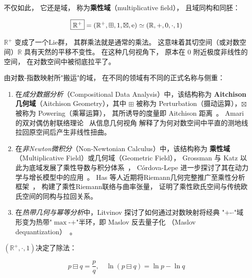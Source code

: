 ﻿\documentclass[10pt,a4paper]{article}
\numberwithin{equation}{section}
\newcommand{\sqplus}{\mathbin{\boxplus}}
\newcommand{\sqtimes}{\mathbin{\boxtimes}}
\newcommand{\sqminus}{\mathbin{\boxminus}}
\begin{document}
不仅如此，
它还是域，
称为\textbf{乘性域}（multiplicative field），
且域同构和同胚：

\begin{equation}
\boxed{\mathbb R^+} = (\mathbb R^+,\sqplus,1,\sqtimes,\text e)
\simeq
(\mathbb R,+,0,\cdot,1)
\label{eq:Multiplicative-Field}
\end{equation}

$\mathbb R^+$ 变成了一个Lie群，
其群乘法就是通常的乘法。
这意味着其切空间（或对数空间）$\mathbb R$ 具有天然的平移不变性。
在这种几何视角下，
原本在 $0$ 附近极度非线性的空间，
在对数空间中被彻底拉平了。

\begin{framed}

由对数-指数映射所"搬运"的域，
在不同的领域有不同的正式名称与侧重：
\begin{enumerate}
  \item 在\emph{成分数据分析}（Compositional Data Analysis）中，该结构称为
  \textbf{Aitchison 几何域}（Aitchison Geometry），其中 $\sqplus$
  被称为 Perturbation（摄动运算），$\sqtimes$ 被称为 Powering（乘幂运算），
  其所诱导的度量即 Aitchison 距离~\cite{Aitchison1986,PawlowskyGlahnEgozcue2001}。
  Amari 的双对偶仿射联络理论~\cite{Amari2016} 从信息几何视角
  解释了为何对数空间中平直的测地线拉回原空间后产生非线性扭曲。

  \item 在\emph{非Newton微积分}（Non-Newtonian Calculus）中，该结构称为
  \textbf{乘性域}（Multiplicative Field）或几何域（Geometric Field），
  Grossman 与 Katz 以此为底域发展了乘性导数与积分体系~\cite{GrossmanKatz1972}，
  Córdova-Lepe 进一步探讨了其在动力学与增长模型中的应用~\cite{CordovaLepe2006}。
  Has 等人近期将Riemann几何完整推广至乘性分析框架~\cite{Has2026}，
  构建了乘性Riemann联络与曲率张量，
  证明了乘性欧氏空间与传统欧氏空间的同构与拉回关系。

  \item 在\emph{热带几何与幂等分析}中，Litvinov 探讨了如何通过对数映射将经典
  "$+$-$\cdot$"域形变为热带"$\max$-$+$"半环，即 Maslov 反去量子化
  （Maslov dequantization）~\cite{Litvinov2007}。
\end{enumerate}

\end{framed}

$(\mathbb R^+,\cdot,1)$决定了除法：

\begin{equation*}
p \sqminus q = \frac{p}{q},\quad
\ln(p \sqminus q) = \ln p - \ln q
\end{equation*}
\end{document}
